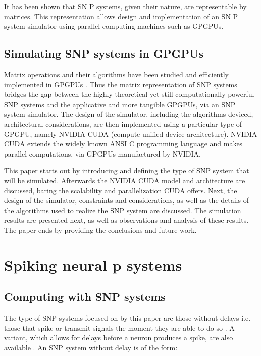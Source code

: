 \documentclass{acm_proc_article-sp}
\begin{document}
It has been shown that SN P systems, given their nature, are representable by matrices\cite{snpbrain}\cite{snpmat}. This representation allows design and implementation of an SN P system simulator using parallel computing machines such as GPGPUs. 

\subsection{Simulating SNP systems in GPGPUs}
Matrix operations and their algorithms have been studied and efficiently implemented in GPGPUs \cite{matrixgpu1}\cite{matrixgpu2}. Thus the matrix representation of SNP systems bridges the gap between the highly theoretical yet still computationally powerful SNP systems and the applicative and more tangible GPGPUs, via an SNP system simulator. The design of the simulator, including the algorithms deviced, architectural considerations, are then implemented using a particular type of GPGPU, namely NVIDIA CUDA (compute unified device architecture). NVIDIA CUDA extends the widely known ANSI C programming language and makes parallel computations, via GPGPUs manufactured by NVIDIA.

This paper starts out by introducing and defining the type of SNP system that will be simulated. Afterwards the NVIDIA CUDA model and architecture are discussed, baring the scalability and parallelization CUDA offers. Next, the design of the simulator, constraints and considerations, as well as the details of the algorithms used to realize the SNP system are discussed. The simulation results are presented next, as well as observations and analysis of these results. The paper ends by providing the conclusions and future work.




\section{Spiking neural p systems}

\subsection{Computing with SNP systems}
The type of SNP systems focused on by this paper are those without delays i.e. those that spike or transmit signals the moment they are able to do so \cite{snpbrain}\cite{snpmat}. A variant, which allows for delays before a neuron produces a spike, are also available \cite{snp}. An SNP system without delay is of the form:
\end{document}
